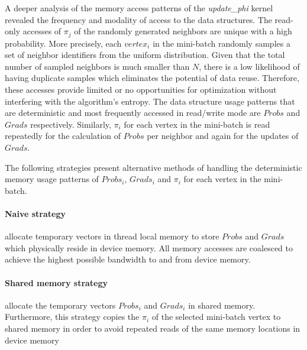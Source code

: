 A deeper analysis of the memory access patterns of the \textit{update\_phi} kernel
revealed the frequency and modality of access to the data structures.
%
The read-only accesses of $\pi_j$ of the randomly generated neighbors are unique
with a high probability. More precisely, each $vertex_i$ in the mini-batch
randomly samples a set of neighbor identifiers from the uniform distribution.
Given that the total number of sampled neighbors is much smaller than $N$,
there is a low likelihood of having duplicate samples which eliminates the
potential of data reuse. Therefore, these accesses provide limited or no
opportunities for optimization without interfering with the algorithm's
entropy.
%
The data structure usage patterns that are deterministic and most frequently
accessed in read/write mode are $Probs$ and $Grads$ respectively. Similarly,
$\pi_i$ for each vertex in the mini-batch is read repeatedly for the
calculation of $Probs$ per neighbor and again for the updates of $Grads$.

The following strategies present alternative methods of handling the
deterministic memory usage patterns of $Probs_i$, $Grads_i$ and $\pi_i$ for each
vertex in the mini-batch.

\paragraph*{\textbf{Naive strategy}} allocate temporary vectors in thread
local memory to store $Probs$ and $Grads$ which physically reside in
device memory. All memory accesses are coalesced to achieve the highest
possible bandwidth to and from device memory.

\paragraph*{\textbf{Shared memory strategy}} allocate the temporary vectors
$Probs_i$ and $Grads_i$
in shared memory. Furthermore, this strategy copies the $\pi_i$ of the selected
mini-batch vertex to shared memory in order to avoid repeated reads of the same
memory locations in device memory

